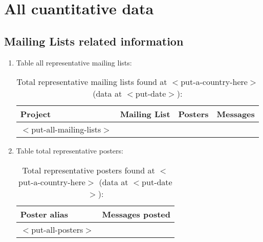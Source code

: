 \documentclass[a4paper,11pt]{report}
\begin{document}

    \newpage
    \section {All cuantitative data}

        \subsection {Mailing Lists related information}
            \begin{enumerate}

                \item Table all representative mailing lists:

                    \begin{table}[h]
                        \begin{center}
                            \caption{\label{TotalMailingLists} Total representative mailing
                            lists found at $<$put-a-country-here$>$ (data at  $<$put-date$>$):}
                            \begin{tabular}[t]{|l|l|c|c|}
                                \hline
                                \textbf{Project} & \textbf{Mailing List} & \textbf{Posters} & \textbf{Messages} \\
                                \hline
$<$put-all-mailing-lists$>$
                            \end{tabular}
                        \end{center}
                    \end{table}


                \item Table total representative posters:
                    \begin{table}[h]
                        \begin{center}
                            \caption{\label{TopPosters} Total representative posters
                            found at $<$put-a-country-here$>$ (data at  $<$put-date$>$):}
                            \begin{tabular}[t]{|l|c|}
                                \hline
                                \textbf{Poster alias} & \textbf{Messages posted}\\
                                \hline
$<$put-all-posters$>$
                            \end{tabular}
                        \end{center}
                    \end{table}

            \end{enumerate}

\end{document}

